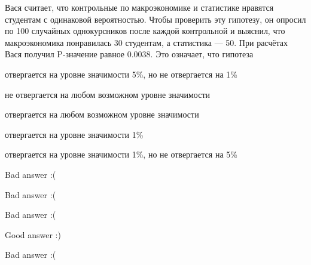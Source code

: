 
\begin{question}
Вася считает, что контрольные по макроэкономике и статистике нравятся
студентам с одинаковой вероятностью. Чтобы проверить эту гипотезу, он
опросил по 100 случайных однокурсников после каждой контрольной и
выяснил, что макроэкономика понравилась 30 студентам, а статистика ---
50. При расчётах Вася получил P-значение равное 0.0038. Это означает,
что гипотеза
\begin{answerlist}
  \item отвергается на уровне значимости 5\%, но не отвергается на 1\%
  \item не отвергается на любом возможном уровне значимости
  \item отвергается на любом возможном уровне значимости
  \item отвергается на уровне значимости 1\%
  \item отвергается на уровне значимости 1\%, но не отвергается на 5\%
\end{answerlist}
\end{question}

\begin{solution}
\begin{answerlist}
  \item Bad answer :(
  \item Bad answer :(
  \item Bad answer :(
  \item Good answer :)
  \item Bad answer :(
\end{answerlist}
\end{solution}

